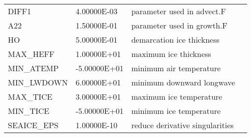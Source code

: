 \begin{table}[!ht]
{\begin{tabular}{|llp{5cm}c|}
   DIFF1               &                   4.00000E-03
    &   parameter used in advect.F 
    &  %
    \\
   A22                 &                   1.50000E-01
    &   parameter used in growth.F 
    &  %
    \\
   HO                  &                   5.00000E-01
    &   demarcation ice thickness 
    &  %
    \\
   MAX\_HEFF            &                   1.00000E+01
    &   maximum ice thickness 
    &  %
    \\
   MIN\_ATEMP           &                  -5.00000E+01
    &   minimum air temperature 
    &  %
    \\
   MIN\_LWDOWN          &                   6.00000E+01
    &   minimum downward longwave 
    &  %
    \\
   MAX\_TICE            &                   3.00000E+01
    &   maximum ice temperature 
    &  %
    \\
   MIN\_TICE            &                  -5.00000E+01
    &   minimum ice temperature 
    &  %
    \\
   SEAICE\_EPS          &                   1.00000E-10
    &   reduce derivative singularities 
    &  %
    \\
\hline
\end{tabular}
}
\end{table}

